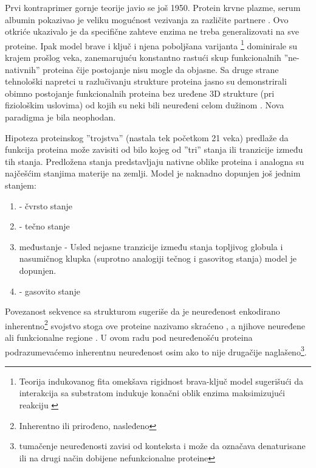 Prvi kontraprimer gornje teorije javio se još 1950. Protein krvne plazme, serum
albumin pokazivao je veliku mogućnost vezivanja za različite
partnere \parencite{dunker2001}. Ovo otkriće ukazivalo je da specifične zahteve
enzima ne treba generalizovati na sve proteine. Ipak model brave i ključ i
njena poboljšana varijanta \footnote{ Teorija
indukovanog fita omekšava rigidnost brava-ključ model sugerišući da interakcija
sa substratom indukuje konačni oblik enzima maksimizujući
reakciju \parencite{biology}}  dominirale su krajem
prošlog veka, zanemarujuću konstantno rastući skup funkcionalnih
''ne-nativnih'' proteina čije postojanje nisu mogle da objasne. Sa druge strane
tehnološki napretci u razlučivanju strukture proteina jasno su demonstrirali
obimno postojanje funkcionalnih proteina bez uređene 3D strukture (pri
fiziološkim uslovima)  od kojih su neki bili neuređeni celom
dužinom \parencite{dunker2001}.  Nova paradigma je bila neophodan.

Hipoteza proteinskog ''trojstva'' \parencite{dunker2001} (nastala tek početkom
21 veka) predlaže da funkcija proteina može zavisiti od bilo kojeg od ''tri''
stanja ili tranzicije između tih stanja. Predložena stanja predstavljaju
nativne oblike proteina i analogna su najčešćim stanjima materije na zemlji.
Model je naknadno dopunjen još jednim stanjem:
\begin{enumerate}
  \item {} - čvrsto stanje

  \item {}  - tečno stanje

  \item {}  međustanje -
    Usled nejasne tranzicije između stanja topljivog globula i nasumičnog
    klupka (suprotno analogiji tečnog i gasovitog stanja) \parencite{dunker2001}
    model je dopunjen.

  \item {}  - gasovito stanje
\end{enumerate}

Povezanost sekvence sa strukturom sugeriše da je neuređenost enkodirano
inherentno\footnote{ Inherentno ili prirođeno, nasleđeno} svojstvo \parencite{dunker2001}
stoga ove proteine nazivamo 
 skraćeno , a njihove neuređene
ali funkcionalne regione  \parencite{uversky2016}. U ovom radu pod
neuređenošću proteina podrazumevaćemo inherentnu neuređenost osim ako to nije
drugačije naglašeno\footnote{ tumačenje neuređenosti zavisi od konteksta i može
  da označava denaturisane ili na drugi način dobijene nefunkcionalne
proteine}.

